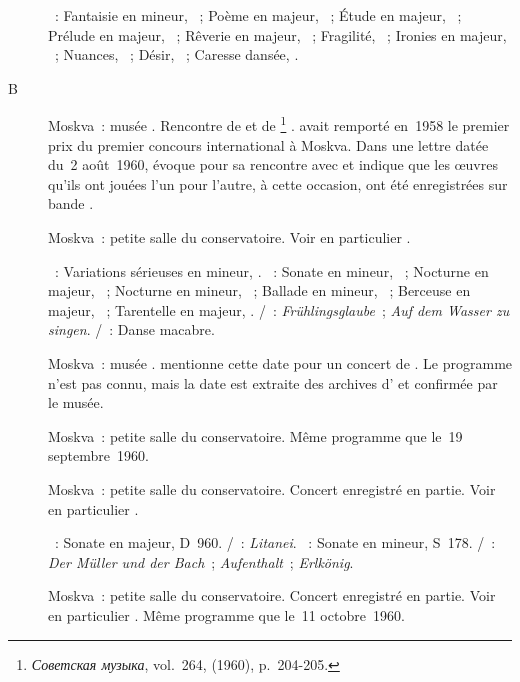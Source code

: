 \begin{description}
 \textsc{\Scriabine{}}~: Fantaisie en \kB mineur, ~; Poème en \kC
 majeur,  ~; Étude en \kE \Flat majeur, 
 ~; Prélude en \kF majeur,  ~; Rêverie en \kC
 majeur,  ~; Fragilité,  ~; Ironies en
 \kC majeur,  ~; Nuances,  ~; Désir,
  ~; Caresse dansée,  .
 \item[B\DateWithWeekDay{1960-07-24}]
 Moskva~: musée \Scriabine{}.
 Rencontre de \VSofronitsky{} et de \VanCliburn{}%
 \footnote{\foreignlanguage{russian}{\emph{Советская музыка}}, vol.~264,
  (1960), p.~204-205.}
 \citep[voir par exemple][p.~399-403]{Shiryaeva}.
 \VanCliburn{} avait remporté en~1958 le premier prix du premier concours
 international \PTchaikovski{} à Moskva.
 Dans une lettre datée du~2 août~1960, \VSofronitsky{} évoque pour \AVizel{}
 sa rencontre avec \VanCliburn{} et indique que les œuvres qu'ils ont jouées
 l'un pour l'autre, à cette occasion, ont été enregistrées sur bande
 \citep[voir][p.~188]{Nekrasova08}.
 \item[\DateWithWeekDay{1960-09-19}]
 Moskva~: petite salle du conservatoire.
 Voir en particulier \citet[p.~451]{Milshteyn82a}.

 \textsc{\Mendelssohn{}}~: Variations sérieuses en \kD mineur, .
 \textsc{\Chopin{}}~: Sonate en \kB mineur, ~; Nocturne en \kG
 majeur,  ~; Nocturne en \kC mineur, 
 ~; Ballade en \kF mineur, ~; Berceuse en \kD \Flat
 majeur, ~; Tarentelle en \kA \Flat majeur, .
 \textsc{\Schubert{}/\Liszt{}}~: \emph{Frühlingsglaube}~; \emph{Auf dem
 Wasser zu singen}.
 \textsc{\SaintSaens{}/\Liszt{}}~: Danse macabre.
 \item[\DateWithWeekDay{1960-09-20}]
 Moskva~: musée \Scriabine{}.
 \citet[p.~188]{Nekrasova08} mentionne cette date pour un concert de
 \VSofronitsky{}.
 Le programme n'est pas connu, mais la date est extraite des archives
 d'\AVizel{} et confirmée par le musée.
 \item[\DateWithWeekDay{1960-09-21}]
 Moskva~: petite salle du conservatoire.
 Même programme que le~19 septembre~1960.
 \item[\DateWithWeekDay{1960-10-11}]
 Moskva~: petite salle du conservatoire.
 Concert enregistré en partie.
 Voir en particulier \citet[p.~451]{Milshteyn82a}.

 \textsc{\Schubert{}}~: Sonate en \kB \Flat majeur, D~960.
 \textsc{\Schubert{}/\Liszt{}}~: \emph{Litanei}.
 \textsc{\Liszt{}}~: Sonate en \kB mineur, S~178.
 \textsc{\Schubert{}/\Liszt{}}~: \emph{Der Müller und der Bach}~;
 \emph{Aufenthalt}~; \emph{Erlkönig}.
 \item[\DateWithWeekDay{1960-10-14}]
 Moskva~: petite salle du conservatoire.
 Concert enregistré en partie.
 Voir en particulier \citet[p.~451]{Milshteyn82a}.
 Même programme que le~11 octobre~1960.


\end{description}
